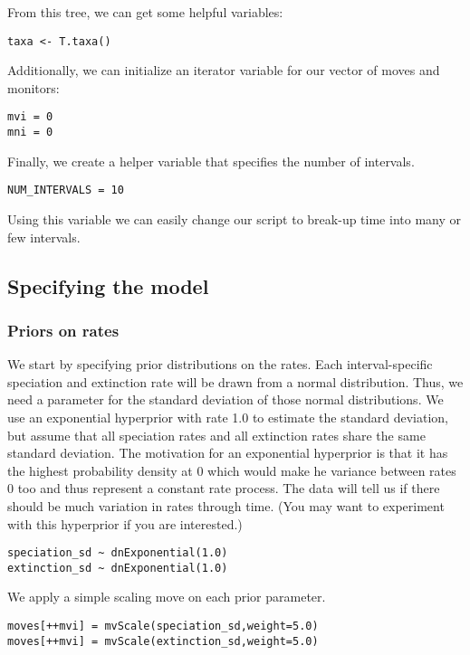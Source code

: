 From this tree, we can get some helpful variables:
{\tt \begin{snugshade*}
\begin{lstlisting}
taxa <- T.taxa()
\end{lstlisting}
\end{snugshade*}}

Additionally, we can initialize an iterator variable for our vector of moves and monitors:
{\tt \begin{snugshade*}
\begin{lstlisting}
mvi = 0
mni = 0
\end{lstlisting}
\end{snugshade*}}

Finally, we create a helper variable that specifies the number of intervals.
{\tt \begin{snugshade*}
\begin{lstlisting}
NUM_INTERVALS = 10
\end{lstlisting}
\end{snugshade*}}
Using this variable we can easily change our script to break-up time into many or few intervals.



\subsection{Specifying the model}

\subsubsection{Priors on rates}
We start by specifying prior distributions on the rates.
Each interval-specific speciation and extinction rate will be drawn from a normal distribution.
Thus, we need a parameter for the standard deviation of those normal distributions.
We use an exponential hyperprior with rate 1.0 to estimate the standard deviation, but assume that all speciation rates and all extinction rates share the same standard deviation.
The motivation for an exponential hyperprior is that it has the highest probability density at 0 which would make he variance between rates 0 too and thus represent a constant rate process.
The data will tell us if there should be much variation in rates through time.
(You may want to experiment with this hyperprior if you are interested.)
{\tt \begin{snugshade*}
\begin{lstlisting}
speciation_sd ~ dnExponential(1.0)
extinction_sd ~ dnExponential(1.0)
\end{lstlisting}
\end{snugshade*}}
We apply a simple scaling move on each prior parameter.
{\tt \begin{snugshade*}
\begin{lstlisting}
moves[++mvi] = mvScale(speciation_sd,weight=5.0)
moves[++mvi] = mvScale(extinction_sd,weight=5.0)
\end{lstlisting}
\end{snugshade*}}

